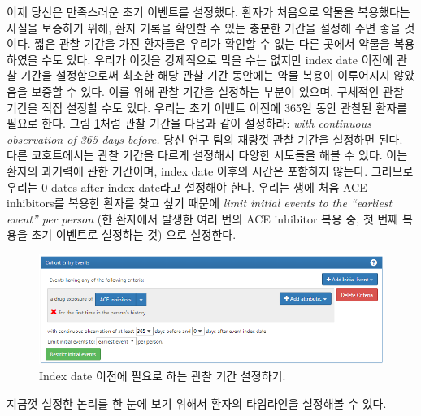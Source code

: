 \documentclass[11pt]{book}
\theoremstyle{definition}
\theoremstyle{definition}
\theoremstyle{definition}
\theoremstyle{remark}
\begin{document}
이제 당신은 만족스러운 초기 이벤트를 설정했다. 환자가 처음으로 약물을
복용했다는 사실을 보증하기 위해, 환자 기록을 확인할 수 있는 충분한
기간을 설정해 주면 좋을 것이다. 짧은 관찰 기간을 가진 환자들은 우리가
확인할 수 없는 다른 곳에서 약물을 복용하였을 수도 있다. 우리가 이것을
강제적으로 막을 수는 없지만 index date 이전에 관찰 기간을 설정함으로써
최소한 해당 관찰 기간 동안에는 약물 복용이 이루어지지 않았음을 보증할 수
있다. 이를 위해 관찰 기간을 설정하는 부분이 있으며, 구체적인 관찰 기간을
직접 설정할 수도 있다. 우리는 초기 이벤트 이전에 365일 동안 관찰된
환자를 필요로 한다. 그림 \ref{fig:initialEventAce}처럼 관찰 기간을
다음과 같이 설정하라: \emph{with continuous observation of 365 days
before.} 당신 연구 팀의 재량껏 관찰 기간을 설정하면 된다. 다른
코호트에서는 관찰 기간을 다르게 설정해서 다양한 시도들을 해볼 수 있다.
이는 환자의 과거력에 관한 기간이며, index date 이후의 시간은 포함하지
않는다. 그러므로 우리는 0 dates after index date라고 설정해야 한다.
우리는 생에 처음 ACE inhibitors를 복용한 환자를 찾고 싶기 때문에
\emph{limit initial events to the ``earliest event'' per person} (한
환자에서 발생한 여러 번의 ACE inhibitor 복용 중, 첫 번째 복용을 초기
이벤트로 설정하는 것) 으로 설정한다.

\begin{figure}

{\centering \includegraphics[width=1\linewidth]{images/Cohorts/initialEventAce} 

}

\caption{Index date 이전에 필요로 하는 관찰 기간 설정하기.}\label{fig:initialEventAce}
\end{figure}

지금껏 설정한 논리를 한 눈에 보기 위해서 환자의 타임라인을 설정해볼 수
있다.
\end{document}
